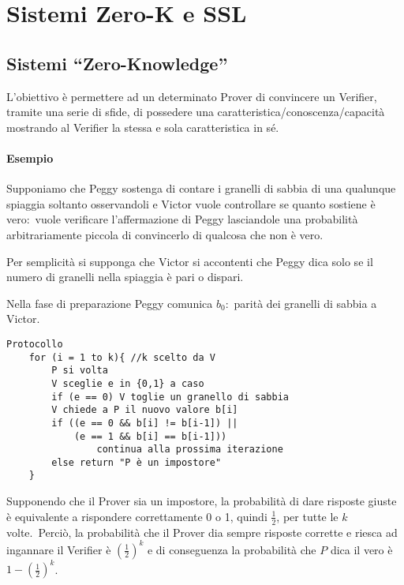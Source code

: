 \chapter{Sistemi Zero-K e SSL}

\section{Sistemi ``Zero-Knowledge''}

L'obiettivo è permettere ad un determinato Prover di convincere un Verifier, tramite una serie di sfide, di possedere una caratteristica{\slash}conoscenza{\slash}capacità mostrando al Verifier la stessa e sola caratteristica in sé.\

\subsubsection{Esempio}

Supponiamo che Peggy sostenga di contare i granelli di sabbia di una qualunque spiaggia soltanto osservandoli e Victor vuole controllare se quanto sostiene è vero:\ vuole verificare l'affermazione di Peggy lasciandole una probabilità arbitrariamente piccola di convincerlo di qualcosa che non è vero.\

Per semplicità si supponga che Victor si accontenti che Peggy dica solo se il numero di granelli nella spiaggia è pari o dispari.\

\vspace{12pt}
\noindent Nella fase di preparazione Peggy comunica $b_0$:\ parità dei granelli di sabbia a Victor.

\begin{verbatim}
Protocollo
    for (i = 1 to k){ //k scelto da V
        P si volta
        V sceglie e in {0,1} a caso
        if (e == 0) V toglie un granello di sabbia
        V chiede a P il nuovo valore b[i]
        if ((e == 0 && b[i] != b[i-1]) ||
            (e == 1 && b[i] == b[i-1]))
                continua alla prossima iterazione
        else return "P è un impostore"
    }
\end{verbatim}

\noindent Supponendo che il Prover sia un impostore, la probabilità di dare risposte giuste è equivalente a rispondere correttamente 0 o 1, quindi $\frac{1}{2}$, per tutte le $k$ volte.\
Perciò, la probabilità che il Prover dia sempre risposte corrette e riesca ad ingannare il Verifier è $\left(\frac{1}{2}\right)^k$ e di conseguenza la probabilità che $P$ dica il vero è $1 -\left(\frac{1}{2}\right)^k$.\

